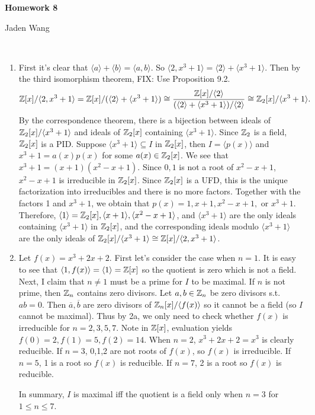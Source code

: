 \documentclass[12pt]{article}
\begin{document}
\centerline {\textsf{\textbf{\LARGE{Homework 8}}}}
\centerline {Jaden Wang}
\vspace{.15in}

\begin{problem}[1]
~\begin{enumerate}[label=(\alph*)]
	\item First it's clear that $ \langle a \rangle+ \langle b \rangle = \langle a,b \rangle$. So $ \langle 2, x^3+1 \rangle = \langle 2 \rangle + \langle x^3+1 \rangle$. Then by the third isomorphism theorem,  FIX: Use Proposition 9.2.
\begin{align*}
	\mathbb{Z} [x] / \langle 2, x^3+1 \rangle = \mathbb{Z}[x] / (\langle 2 \rangle+ \langle x^3+1 \rangle) \cong \frac{\mathbb{Z}[x] / \langle 2 \rangle}{ (\langle 2 \rangle+ \langle x^3+1 \rangle) / \langle 2 \rangle} \cong \mathbb{Z}_2[x] / \langle x^3+1 \rangle.
\end{align*}
By the correspondence theorem, there is a bijection between ideals of $ \mathbb{Z}_2[x] / \langle x^3+1 \rangle$ and ideals of $\mathbb{Z}_2[x] $ containing $ \langle x^3+1 \rangle$. Since $ \mathbb{Z}_2$ is a field, $ \mathbb{Z}_2[x]$ is a PID. Suppose $ \langle x^3+1 \rangle \subseteq I$ in $ \mathbb{Z}_2[x]$, then $ I = \langle p(x) \rangle$ and $ x^3+1 = a(x)p(x)$ for some $ a(x) \in \mathbb{Z}_2[x]$. We see that $ x^3+1 = (x+1)(x^2-x+1)$. Since $ 0,1$ is not a root of  $ x^2-x+1$, $ x^2-x+1$ is irreducible in $ \mathbb{Z}_2[x]$. Since $ \mathbb{Z}_2[x]$ is a UFD, this is the unique factorization into irreducibles and there is no more factors. Together with the factors 1 and $ x^3+1$, we obtain that $ p(x) =1, x+1, x^2-x+1,$ or $ x^3+1$. Therefore, $\langle 1 \rangle=\mathbb{Z}_2[x], \langle x+1 \rangle, \langle x^2-x+1 \rangle$, and $ \langle x^3+1 \rangle$ are the only ideals containing $ \langle x^3+1 \rangle$ in $ \mathbb{Z}_2[x]$, and the corresponding ideals modulo $ \langle x^3+1 \rangle$ are the only ideals of $ \mathbb{Z}_2[x] /\langle x^3+1 \rangle \cong \mathbb{Z}[x] / \langle 2, x^3+1 \rangle$.
\item Let $ f(x) = x^3+2x+2$. First let's consider the case when $ n=1$. It is easy to see that  $ \langle 1,f(x) \rangle = \langle 1 \rangle = \mathbb{Z}[x]$ so the quotient is zero which is not a field. Next, I claim that $ n \neq 1$ must be a prime for  $ I$ to be maximal. If  $ n$ is not prime, then  $ \mathbb{Z}_n$ contains zero divisors. Let $ a,b \in \mathbb{Z}_n$ be zero divisors  s.t.\ $ ab=0$. Then $ \overline{a} ,\overline{b}$ are zero divisors of $ \mathbb{Z}_n[x] / \langle f(x) \rangle$ so it cannot be a field (so $ I$ cannot be maximal). Thus by 2a, we only need to check whether $ f(x)$ is irreducible for $ n=2,3,5,7$. Note in $ \mathbb{Z}[x]$, evaluation yields $ f(0) = 2, f(1)=5, f(2)=14$. When  $ n=2$,  $ x^3+2x+2 = x^3$ is clearly reducible. If $ n=3$, 0,1,2 are not roots of $ f(x)$, so $ f(x)$ is irreducible. If  $ n=5$, 1 is a root so  $ f(x)$ is reducible. If  $ n=7$,  2 is a root so $ f(x)$ is reducible.

	In summary,  $ I$ is maximal iff the quotient is a field only when  $ n=3$ for $ 1\leq n \leq 7$.
\end{enumerate}
\end{problem}
\end{document}

